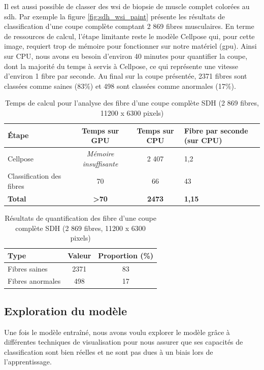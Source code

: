 Il est aussi possible de classer des \gls{wsi} de biopsie de muscle complet colorées au \gls{sdh}. Par exemple la figure \ref{fig:sdh_wsi_paint} présente les résultats de classification d'une coupe complète comptant 2 869 fibres musculaires. En terme de ressources de calcul, l'étape limitante reste le modèle Cellpose qui, pour cette image, requiert trop de mémoire pour fonctionner sur notre matériel (\gls{gpu}). Ainsi sur CPU, nous avons eu besoin d'environ 40 minutes pour quantifier la coupe, dont la majorité du temps à servis à Cellpose,  ce qui représente une vitesse d'environ 1 fibre par seconde. Au final sur la coupe présentée, 2371 fibres sont classées comme saines (83\%) et 498 sont classées comme anormales (17\%).

\begin{table}[htbp]
\centering
\caption{Temps de calcul pour l'analyse des fibre d'une coupe complète SDH (2 869 fibres, 11200 x 6300 pixels)}
\label{tab:sdh_wsi_timetable}
\begin{tabularx}{\textwidth}{|l|c|c|X|}
\hline
\textbf{Étape} & \textbf{Temps sur GPU} & \textbf{Temps sur CPU} & \textbf{Fibre par seconde (sur CPU)} \\
\hline
Cellpose & \textit{Mémoire insuffisante} & 2 407 & 1,2 \\
\hline
Classification des fibres & 70 & 66 & 43 \\
\hline
\textbf{Total} & \textbf{>70} & \textbf{2473} & \textbf{1,15} \\
\hline
\end{tabularx}
\end{table}
\begin{table}[htbp]
\centering
\caption{Résultats de quantification des  fibre d'une coupe complète SDH (2 869 fibres, 11200 x 6300 pixels)}
\label{tab:sdh_wsi_resultstable}
\begin{tabular}{|l|c|c|}
\hline
\textbf{Type} & \textbf{Valeur} & \textbf{Proportion (\%)} \\
\hline
Fibres saines & 2371 & 83 \\
\hline
Fibres anormales & 498 & 17 \\
\hline
\end{tabular}
\end{table}


\subsection{Exploration du modèle}
Une fois le modèle entraîné, nous avons voulu explorer le modèle grâce à différentes techniques de visualisation pour nous assurer que ses capacités de classification sont bien réelles et ne sont pas dues à un biais lors de l'apprentissage.

